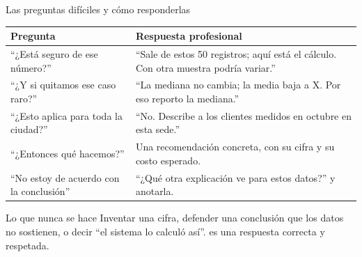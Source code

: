 \documentclass[aspectratio=169,10pt]{beamer}
\begin{document}
\begin{frame}{Las preguntas difíciles y cómo responderlas}
  \scriptsize
  \begin{center}
  \begin{tabular}{@{}p{4.6cm}p{7.2cm}@{}}
    \toprule
    \textbf{Pregunta} & \textbf{Respuesta profesional} \\
    \midrule
    ``¿Está seguro de ese número?'' &
      ``Sale de estos 50 registros; aquí está el cálculo. Con otra muestra
      podría variar.'' \\
    \addlinespace
    ``¿Y si quitamos ese caso raro?'' &
      ``La mediana no cambia; la media baja a X. Por eso reporto la mediana.'' \\
    \addlinespace
    ``¿Esto aplica para toda la ciudad?'' &
      ``No. Describe a los clientes medidos en octubre en esta sede.'' \\
    \addlinespace
    ``¿Entonces qué hacemos?'' &
      Una recomendación concreta, con su cifra y su costo esperado. \\
    \addlinespace
    ``No estoy de acuerdo con la conclusión'' &
      ``¿Qué otra explicación ve para estos datos?'' y anotarla. \\
    \bottomrule
  \end{tabular}
  \end{center}

  \vspace{0.05cm}
  \begin{alertblock}{Lo que nunca se hace}
    \tiny
    Inventar una cifra, defender una conclusión que los datos no sostienen, o
    decir ``el sistema lo calculó así''.  es una respuesta correcta y respetada.
  \end{alertblock}
\end{frame}
\end{document}
